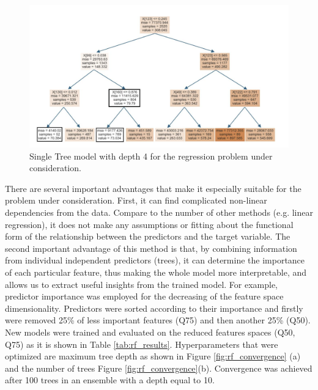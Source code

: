 \begin{figure}[H]
	\centering
	\includegraphics[width=140mm]{fig/ml_fig/rf_scetch.png}
	\caption[Single Tree model with depth 4 for the regression problem under consideration.]{Single Tree model with depth 4 for the regression problem under consideration.}
\label{fig:rf_scetch}
\end{figure}

There are several important advantages that make it especially suitable for the problem under consideration. First, it can find complicated non-linear dependencies from the data. Compare to the number of other methods (e.g. linear regression), it does not make any assumptions or fitting about the functional form of the relationship between the predictors and the target variable. The second important advantage of this method is that, by combining information from individual independent predictors (trees), it can determine the importance of each particular feature, thus making the whole model more interpretable, and allows us to extract useful insights from the trained model.
For example, predictor importance was employed for the decreasing of the feature space dimensionality. Predictors were sorted according to their importance and firstly were removed 25\% of less important features (Q75) and then another 25\% (Q50). New models were trained and evaluated on the reduced features spaces (Q50, Q75) as it is shown in Table \ref{tab:rf_results}.
Hyperparameters that were optimized are maximum tree depth as shown in Figure \ref{fig:rf_convergence} (a) and the number of trees Figure \ref{fig:rf_convergence}(b). Convergence was achieved after 100 trees in an ensemble with a depth equal to 10.

